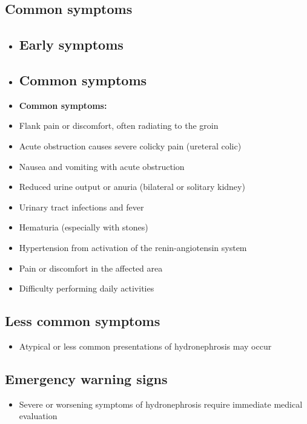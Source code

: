 \subsection{Common symptoms}
\begin{itemize}[noitemsep]
  \item \subsection{Early symptoms}
  \item \subsection{Common symptoms}
  \item \textbf{Common symptoms:}
  \item Flank pain or discomfort, often radiating to the groin
  \item Acute obstruction causes severe colicky pain (ureteral colic)
  \item Nausea and vomiting with acute obstruction
  \item Reduced urine output or anuria (bilateral or solitary kidney)
  \item Urinary tract infections and fever
  \item Hematuria (especially with stones)
  \item Hypertension from activation of the renin-angiotensin system
  \item Pain or discomfort in the affected area
  \item Difficulty performing daily activities
\end{itemize}

\subsection{Less common symptoms}
\begin{itemize}[noitemsep]
  \item Atypical or less common presentations of hydronephrosis may occur
\end{itemize}

\subsection{Emergency warning signs}
\begin{itemize}[noitemsep]
  \item Severe or worsening symptoms of hydronephrosis require immediate medical evaluation
\end{itemize}
